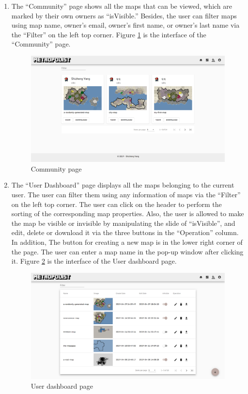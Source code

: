 \begin{enumerate}
  \item The ``Community'' page shows all the maps that can be viewed, which are marked by their own owners as ``isVisible.'' Besides, the user can filter maps using map name, owner's email, owner's first name, or owner's last name via the ``Filter'' on the left top corner. Figure \ref{fig:GUI community} is the interface of the ``Community'' page.

  \begin{figure}[htbp]
    \includegraphics[width=\textwidth]{section04/assets/GUI-community.png}
    \caption{Community page}
    \label{fig:GUI community}
  \end{figure}

  \item The ``User Dashboard'' page displays all the maps belonging to the current user. The user can filter them using any information of maps via the ``Filter'' on the left top corner. The user can click on the header to perform the sorting of the corresponding map properties. Also, the user is allowed to make the map be visible or invisible by manipulating the slide of ``isVisible'', and edit, delete or download it via the three buttons in the ``Operation'' column. In addition, The button for creating a new map is in the lower right corner of the page. The user can enter a map name in the pop-up window after clicking it. Figure \ref{fig:GUI user dashboard} is the interface of the User dashboard page.

  \begin{figure}[htbp]
    \includegraphics[width=\textwidth]{section04/assets/GUI-user.png}
    \caption{User dashboard page}
    \label{fig:GUI user dashboard}
  \end{figure}


\end{enumerate}
